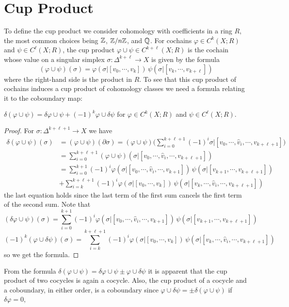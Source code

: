 \section{Cup Product}
To define the cup product we consider cohomology with coefficients in a ring $R$, the most common choices being $\mathbb{Z}$, $\mathbb{Z}/n\mathbb{Z}$, and $\mathbb{Q}$. For cochains $\varphi\in C^k(X;R)$ and $\psi\in C^\ell(X;R)$, the cup product $\varphi\cup\psi\in C^{k+\ell}(X;R)$ is the cochain whose value on a singular simplex $\sigma:\Delta^{k+\ell}\to X$ is given by the formula
\[(\varphi\cup\psi)(\sigma)=\varphi(\sigma|[v_0,\cdots,v_k])\,\psi(\sigma|[v_{k},\cdots,v_{k+\ell}])\]
where the right-hand side is the product in $R$. To see that this cup product of cochains induces a cup product of cohomology classes we need a formula relating it to the coboundary map:
\begin{lemma}
$\delta(\varphi\cup\psi)=\delta\varphi\cup\psi+(-1)^{k}\varphi\cup\delta\psi$ for $\varphi\in C^k(X;R)$ and $\psi\in C^\ell(X;R)$.
\end{lemma}
\begin{proof}
For $\sigma:\Delta^{k+\ell+1}\to X$ we have
\begin{align*}
\delta(\varphi\cup\psi)(\sigma)&=(\varphi\cup\psi)(\partial\sigma)=(\varphi\cup\psi)\Big(\sum_{i=0}^{k+\ell+1}(-1)^i\sigma|[v_0,\cdots,\widehat{v}_i,\cdots,v_{k+\ell+1}]\Big)\\
&=\sum_{i=0}^{k+\ell+1}(\varphi\cup\psi)(\sigma|[v_0,\cdots,\widehat{v}_i,\cdots,v_{k+\ell+1}])\\
&=\sum_{i=0}^{k+1}(-1)^i\varphi(\sigma|[v_0,\cdots,\widehat{v}_i,\cdots,v_{k+1}])\,\psi(\sigma|[v_{k+1},\cdots,v_{k+\ell+1}])\\
&+\sum_{i=k}^{k+\ell+1}(-1)^i\varphi(\sigma|[v_0,\cdots,v_k])\,\psi(\sigma|[v_{k},\cdots,\widehat{v}_i,\cdots,v_{k+\ell+1}])
\end{align*}
the last equation holds since the last term of the first sum cancels the first term of the second sum. Note that
\[(\delta\varphi\cup\psi)(\sigma)=\sum_{i=0}^{k+1}(-1)^i\varphi(\sigma|[v_0,\cdots,\widehat{v}_i,\cdots,v_{k+1}])\,\psi(\sigma|[v_{k+1},\cdots,v_{k+\ell+1}])\]
\[(-1)^k(\varphi\cup\delta\psi)(\sigma)=\sum_{i=k}^{k+\ell+1}(-1)^i\varphi(\sigma|[v_0,\cdots,v_k])\,\psi(\sigma|[v_{k},\cdots,\widehat{v}_i,\cdots,v_{k+\ell+1}])\]
so we get the formula.
\end{proof}
From the formula $\delta(\varphi\cup\psi)=\delta\varphi\cup\psi\pm\varphi\cup\delta\psi$ it is apparent that the cup product of two cocycles is again a cocycle. Also, the cup product of a cocycle and a coboundary, in either order, is a coboundary since $\varphi\cup\delta\psi=\pm\delta(\varphi\cup\psi)$ if $\delta\varphi=0$,
